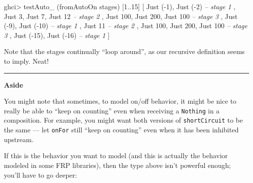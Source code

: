 \documentclass[]{article}
\newenvironment{Shaded}{}{}
\newcommand{\CommentTok}[1]{\textcolor[rgb]{0.38,0.63,0.69}{\textit{#1}}}
\newcommand{\DataTypeTok}[1]{\textcolor[rgb]{0.56,0.13,0.00}{#1}}
\newcommand{\DecValTok}[1]{\textcolor[rgb]{0.25,0.63,0.44}{#1}}
\newcommand{\FunctionTok}[1]{\textcolor[rgb]{0.02,0.16,0.49}{#1}}
\newcommand{\NormalTok}[1]{#1}
\begin{document}
\begin{Shaded}
\begin{Highlighting}[]
\NormalTok{ghci}\FunctionTok{>}\NormalTok{ testAuto_ (fromAutoOn stages) [}\DecValTok{1}\FunctionTok{..}\DecValTok{15}\NormalTok{]}
\NormalTok{[ }\DataTypeTok{Just}\NormalTok{ (}\FunctionTok{-}\DecValTok{1}\NormalTok{), }\DataTypeTok{Just}\NormalTok{ (}\FunctionTok{-}\DecValTok{2}\NormalTok{)              }\CommentTok{-- stage 1}
\NormalTok{, }\DataTypeTok{Just} \DecValTok{3}\NormalTok{, }\DataTypeTok{Just} \DecValTok{7}\NormalTok{, }\DataTypeTok{Just} \DecValTok{12}           \CommentTok{-- stage 2}
\NormalTok{, }\DataTypeTok{Just} \DecValTok{100}\NormalTok{, }\DataTypeTok{Just} \DecValTok{200}\NormalTok{, }\DataTypeTok{Just} \DecValTok{100}      \CommentTok{-- stage 3}
\NormalTok{, }\DataTypeTok{Just}\NormalTok{ (}\FunctionTok{-}\DecValTok{9}\NormalTok{), }\DataTypeTok{Just}\NormalTok{ (}\FunctionTok{-}\DecValTok{10}\NormalTok{)             }\CommentTok{-- stage 1}
\NormalTok{, }\DataTypeTok{Just} \DecValTok{11}                           \CommentTok{-- stage 2}
\NormalTok{, }\DataTypeTok{Just} \DecValTok{100}\NormalTok{, }\DataTypeTok{Just} \DecValTok{200}\NormalTok{, }\DataTypeTok{Just} \DecValTok{100}      \CommentTok{-- stage 3}
\NormalTok{, }\DataTypeTok{Just}\NormalTok{ (}\FunctionTok{-}\DecValTok{15}\NormalTok{), }\DataTypeTok{Just}\NormalTok{ (}\FunctionTok{-}\DecValTok{16}\NormalTok{)            }\CommentTok{-- stage 1}
\NormalTok{]}
\end{Highlighting}
\end{Shaded}

Note that the stages continually ``loop around'', as our recursive definition
seems to imply. Neat!

\begin{center}\rule{0.5\linewidth}{\linethickness}\end{center}

\textbf{Aside}

You might note that sometimes, to model on/off behavior, it might be nice to
really be able to ``keep on counting'' even when receiving a \texttt{Nothing} in
a composition. For example, you might want both versions of
\texttt{shortCircuit} to be the same --- let \texttt{onFor} still ``keep on
counting'' even when it has been inhibited upstream.

If this is the behavior you want to model (and this is actually the behavior
modeled in some FRP libraries), then the type above isn't powerful enough;
you'll have to go deeper:
\end{document}
